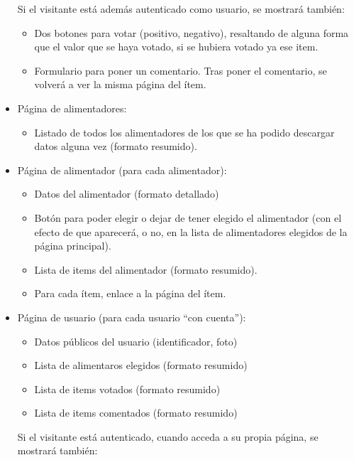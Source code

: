 \begin{itemize}
    Si el visitante está además autenticado como usuario, se mostrará también:

    \begin{itemize}
    \item Dos botones para votar (positivo, negativo), resaltando de alguna forma que el valor que se haya votado, si se hubiera votado ya ese item.
    \item Formulario para poner un comentario. Tras poner el comentario, se volverá a ver la misma página del ítem.
    \end{itemize}

  \item Página de alimentadores:

    \begin{itemize}
    \item Listado de todos los alimentadores de los que se ha podido descargar datos alguna vez (formato resumido).
    \end{itemize}
    
  \item Página de alimentador (para cada alimentador):

    \begin{itemize}
    \item Datos del alimentador (formato detallado)
    \item Botón para poder elegir o dejar de tener elegido el alimentador (con el efecto de que aparecerá, o no, en la lista de alimentadores elegidos de la página principal).
    \item Lista de items del alimentador (formato resumido).
    \item Para cada ítem, enlace a la página del ítem.
    \end{itemize}

  \item Página de usuario (para cada usuario ``con cuenta''):

    \begin{itemize}
    \item Datos públicos del usuario (identificador, foto)
    \item Lista de alimentaros elegidos (formato resumido)
    \item Lista de items votados (formato resumido)
    \item Lista de items comentados (formato resumido)
    \end{itemize}

    Si el visitante está autenticado, cuando acceda a su propia página, se mostrará también:


\end{itemize}
